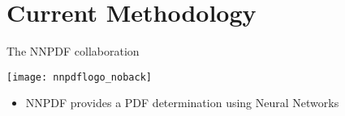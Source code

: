 
%
%
%


\section{Current Methodology}

\begin{frame}{The NNPDF collaboration}

\vspace*{\titleskip}

\begin{center}
\texttt{[image: nnpdflogo\_noback]}
\end{center}

\vspace*{\secondskip}

\begin{itemize}
	\item NNPDF provides a PDF determination using Neural Networks
\end{itemize}

\end{frame}


